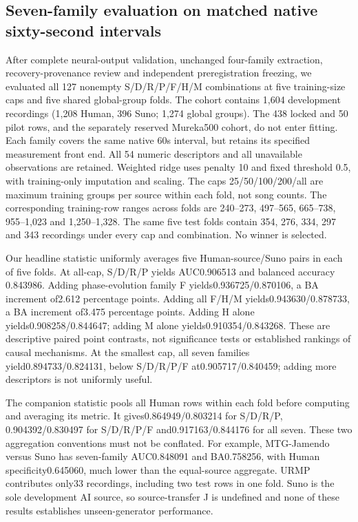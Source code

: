 \subsection{Seven-family evaluation on matched native sixty-second intervals}

After complete neural-output validation, unchanged four-family extraction,
recovery-provenance review and independent preregistration freezing, we evaluated
all 127 nonempty S/D/R/P/F/H/M combinations at five training-size caps and five
shared global-group folds. The cohort contains 1,604 development recordings
(1,208 Human, 396 Suno; 1,274 global groups). The 438 locked and 50 pilot rows,
and the separately reserved Mureka500 cohort, do not enter fitting. Each family
covers the same native 60s interval, but retains its specified measurement front
end. All 54 numeric descriptors and all unavailable observations are retained.
Weighted ridge uses penalty 10 and fixed threshold 0.5, with training-only
imputation and scaling. The caps 25/50/100/200/all are maximum training groups
per source within each fold, not song counts. The corresponding training-row
ranges across folds are 240--273, 497--565, 665--738, 955--1,023 and
1,250--1,328. The same five test folds contain 354, 276, 334, 297 and 343
recordings under every cap and combination. No winner is selected.

Our headline statistic uniformly averages five Human-source/Suno pairs in each
of five folds. At all-cap, S/D/R/P yields AUC0.906513 and balanced accuracy
0.843986. Adding phase-evolution family F yields0.936725/0.870106, a BA increment
of2.612 percentage points. Adding all F/H/M yields0.943630/0.878733, a BA
increment of3.475 percentage points. Adding H alone yields0.908258/0.844647;
adding M alone yields0.910354/0.843268. These are descriptive paired point
contrasts, not significance tests or established rankings of causal mechanisms.
At the smallest cap, all seven families yield0.894733/0.824131, below
S/D/R/P/F at0.905717/0.840459; adding more descriptors is not uniformly useful.

The companion statistic pools all Human rows within each fold before computing
and averaging its metric. It gives0.864949/0.803214 for S/D/R/P,
0.904392/0.830497 for S/D/R/P/F and0.917163/0.844176 for all seven.
These two aggregation conventions must not be conflated. For example,
MTG-Jamendo versus Suno has seven-family AUC0.848091 and BA0.758256, with
Human specificity0.645060, much lower than the equal-source aggregate.
URMP contributes only33 recordings, including two test rows in one fold.
Suno is the sole development AI source, so source-transfer J is undefined and
none of these results establishes unseen-generator performance.

